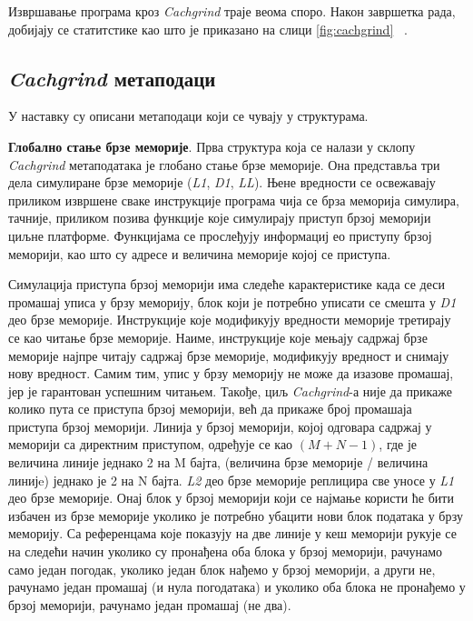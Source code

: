 \documentclass[12pt,oneside]{memoir}
\begin{document}
\indent Извршавање програма кроз \textit{Cachgrind} траје веома споро. Након завршетка рада, добијају се статитстике као што је приказано на слици \ref{fig:cachgrind} ~\cite{cachegrindRef}.

\subsection{\textit{Cachgrind} метаподаци}

\indent У наставку су описани метаподаци који се чувају у структурама.

\indent \textbf{Глобално стање брзе меморије}. Прва структура која се налази у склопу \textit{Cachgrind} метаподатака је глобано стање брзе меморије. Она представља три дела симулиране брзе меморије (\textit{L1}, \textit{D1},  \textit{LL}). Њене вредности се освежавају приликом извршене сваке инструкције програма чија се брза меморија симулира, тачније, приликом позива функције које симулирају приступ брзој меморији циљне платформе. Функцијама се прослеђују информациј ео приступу брзој меморији, као што су адресе и величина меморије којој се приступа.

\indent Симулација приступа брзој меморији има следеће карактеристике када се деси промашај уписа у брзу меморију, блок који је потребно уписати се смешта у \textit{D1} део брзе меморије. Инструкције које модификују вредности меморије третирају се као читање брзе меморије. Наиме, инструкције које мењају садржај брзе меморије најпре читају садржај брзе меморије, модификују вредност и снимају нову вредност. Самим тим, упис у брзу меморију не може да изазове промашај, јер је гарантован успешним читањем. Такође, циљ \textit{Cachgrind}-а није да прикаже колико пута се приступа брзој меморији, већ да прикаже број промашаја приступа брзој меморији. Линија у брзој меморији, којој одговара садржај у меморији са директним приступом, одређује се као $(M + N - 1)$, где је величина линије једнако 2 на M бајта, (величина брзе меморије / величина линијe) једнако је 2 на N бајта. \textit{L2} део брзе меморије реплицира све уносе у \textit{L1} део брзе меморије. Онај блок у брзој меморији који се најмање користи ће бити избачен из брзе меморије уколико је потребно убацити нови блок података у брзу меморију. Са референцама које показују на две линије у кеш меморији рукује се на следећи начин уколико су пронађена оба блока у брзој меморији, рачунамо само један погодак, уколико један блок нађемо у брзој меморији, а други не, рачунамо један промашај (и нула погодатака) и уколико оба блока не пронађемо у брзој меморији, рачунамо један промашај (не два).
\end{document}
